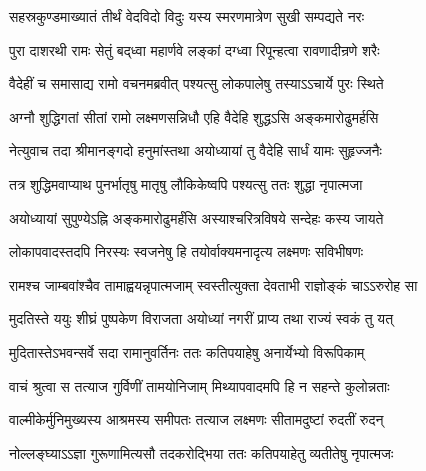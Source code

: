 
\translink{}

\storymeta


\twolineshloka
{सहस्रकुण्डमाख्यातं तीर्थं वेदविदो विदुः}
{यस्य स्मरणमात्रेण सुखी सम्पद्यते नरः} %

\twolineshloka
{पुरा दाशरथी रामः सेतुं बद्‌ध्वा महार्णवे}
{लङ्कां दग्ध्वा रिपून्हत्वा रावणादीन्रणे शरैः} %

\twolineshloka
{वैदेहीं च समासाद्य रामो वचनमब्रवीत्}
{पश्यत्सु लोकपालेषु तस्याऽऽचार्ये पुरः स्थिते} %

\twolineshloka
{अग्नौ शुद्धिगतां सीतां रामो लक्ष्मणसन्निधौ}
{एहि वैदेहि शुद्धऽसि अङ्कमारोढुमर्हसि} %

\twolineshloka
{नेत्युवाच तदा श्रीमानङ्गदो हनुमांस्तथा}
{अयोध्यायां तु वैदेहि सार्धं यामः सुहृज्जनैः} %

\twolineshloka
{तत्र शुद्धिमवाप्याथ पुनर्भातृषु मातृषु}
{लौकिकेष्वपि पश्यत्सु ततः शुद्धा नृपात्मजा} %

\twolineshloka
{अयोध्यायां सुपुण्येऽह्नि अङ्कमारोढुमर्हंसि}
{अस्याश्चरित्रविषये सन्देहः कस्य जायते} %

\twolineshloka
{लोकापवादस्तदपि निरस्यः स्वजनेषु हि}
{तयोर्वाक्यमनादृत्य लक्ष्मणः सविभीषणः} %

\twolineshloka
{रामश्च जाम्बवांश्चैव तामाह्वयन्नृपात्मजाम्}
{स्वस्तीत्युक्ता देवताभी राज्ञोङ्कं चाऽऽरुरोह सा} %

\twolineshloka
{मुदतिस्ते ययुः शीघ्रं पुष्पकेण विराजता}
{अयोध्यां नगरीं प्राप्य तथा राज्यं स्वकं तु यत्} %

\twolineshloka
{मुदितास्तेऽभवन्सर्वे सदा रामानुवर्तिनः}
{ततः कतिपयाहेषु अनार्येभ्यो विरूपिकाम्} %

\twolineshloka
{वाचं श्रुत्वा स तत्याज गुर्विणीं तामयोनिजाम्}
{मिथ्यापवादमपि हि न सहन्ते कुलोन्नताः} %

\twolineshloka
{वाल्मीकेर्मुनिमुख्यस्य आश्रमस्य समीपतः}
{तत्याज लक्ष्मणः सीतामदुष्टां रुदतीं रुदन्} %

\twolineshloka
{नोल्लङ्घ्याऽऽज्ञा गुरूणामित्यसौ तदकरोद्भिया}
{ततः कतिपयाहेतु व्यतीतेषु नृपात्मजः} %

